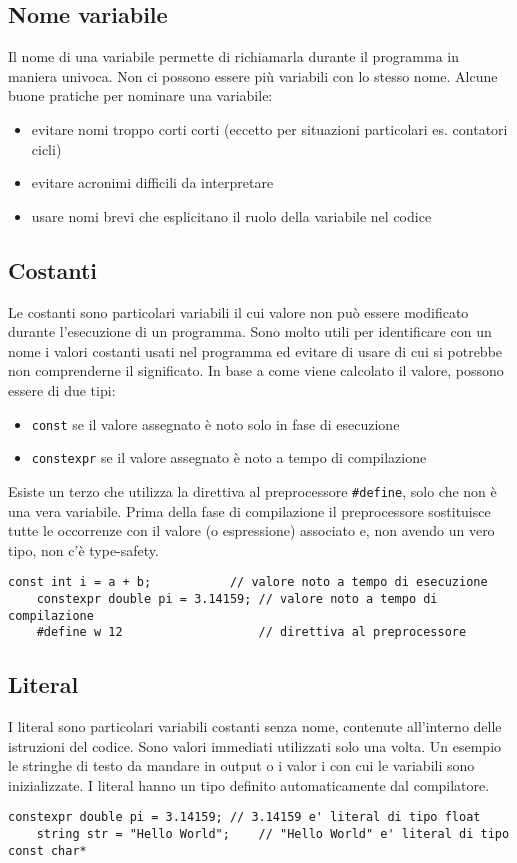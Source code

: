 \documentclass[a4paper]{article}
\begin{document}
\newpage

\subsection{Nome variabile}
Il nome di una variabile permette di richiamarla durante il programma in maniera univoca. Non ci possono essere più variabili con
lo stesso nome. Alcune buone pratiche per nominare una variabile:
\begin{itemize}
	\item evitare nomi troppo corti corti (eccetto per situazioni particolari es. contatori cicli)
	\item evitare acronimi difficili da interpretare
	\item usare nomi brevi che esplicitano il ruolo della variabile nel codice
\end{itemize}

\subsection{Costanti}
Le costanti sono particolari variabili il cui valore non può essere modificato durante l'esecuzione di un programma. Sono molto
utili per identificare con un nome i valori costanti usati nel programma ed evitare di usare  di cui si
potrebbe non comprenderne il significato. In base a come viene calcolato il valore, possono essere di due tipi:
\begin{itemize}
	\item \verb|const| se il valore assegnato è noto solo in fase di esecuzione
	\item \verb|constexpr| se il valore assegnato è noto a tempo di compilazione
\end{itemize}
Esiste un terzo  che utilizza la direttiva al preprocessore \verb|#define|, solo che non è una vera variabile. Prima
della fase di compilazione il preprocessore sostituisce tutte le occorrenze con il valore (o espressione) associato e, non avendo
un vero tipo, non c'è type-safety.
\begin{lstlisting}[numbers=none]
	const int i = a + b;           // valore noto a tempo di esecuzione
	constexpr double pi = 3.14159; // valore noto a tempo di compilazione
	#define w 12                   // direttiva al preprocessore
\end{lstlisting}

\subsection{Literal}
I literal sono particolari variabili costanti senza nome, contenute all'interno delle istruzioni del codice. Sono valori
immediati utilizzati solo una volta. Un esempio le stringhe di testo da mandare in output o i valor i con cui le variabili
sono inizializzate. I literal hanno un tipo definito automaticamente dal compilatore.
\begin{lstlisting}[numbers=none]
	constexpr double pi = 3.14159; // 3.14159 e' literal di tipo float
	string str = "Hello World";    // "Hello World" e' literal di tipo const char*
\end{lstlisting}
\end{document}
